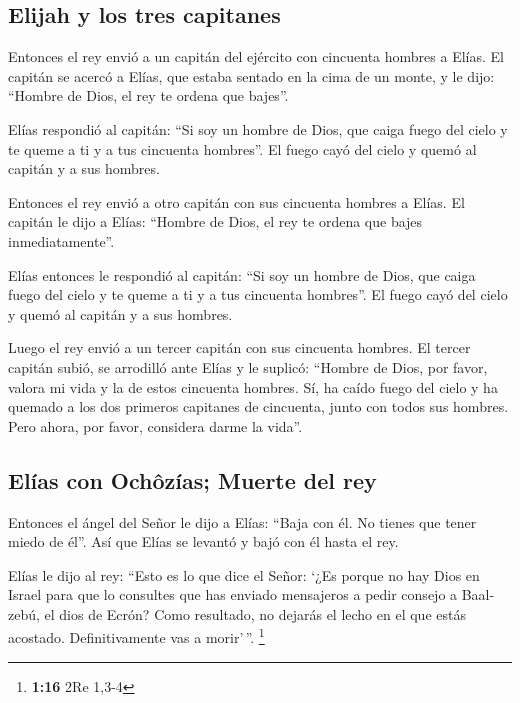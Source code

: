 \hypertarget{elijah-y-los-tres-capitanes}{%
\subsection{Elijah y los tres
capitanes}\label{elijah-y-los-tres-capitanes}}

 Entonces el rey envió a un capitán del ejército con
cincuenta hombres a Elías. El capitán se acercó a Elías, que estaba
sentado en la cima de un monte, y le dijo: ``Hombre de Dios, el rey te
ordena que bajes''.

 Elías respondió al capitán: ``Si soy un hombre de Dios,
que caiga fuego del cielo y te queme a ti y a tus cincuenta hombres''.
El fuego cayó del cielo y quemó al capitán y a sus hombres.

 Entonces el rey envió a otro capitán con sus cincuenta
hombres a Elías. El capitán le dijo a Elías: ``Hombre de Dios, el rey te
ordena que bajes inmediatamente''.

 Elías entonces le respondió al capitán: ``Si soy un
hombre de Dios, que caiga fuego del cielo y te queme a ti y a tus
cincuenta hombres''. El fuego cayó del cielo y quemó al capitán y a sus
hombres.

 Luego el rey envió a un tercer capitán con sus cincuenta
hombres. El tercer capitán subió, se arrodilló ante Elías y le suplicó:
``Hombre de Dios, por favor, valora mi vida y la de estos cincuenta
hombres.  Sí, ha caído fuego del cielo y ha quemado a los
dos primeros capitanes de cincuenta, junto con todos sus hombres. Pero
ahora, por favor, considera darme la vida''.

\hypertarget{eluxedas-con-ochuxf4zuxedas-muerte-del-rey}{%
\subsection{Elías con Ochôzías; Muerte del
rey}\label{eluxedas-con-ochuxf4zuxedas-muerte-del-rey}}

 Entonces el ángel del Señor le dijo a Elías: ``Baja con
él. No tienes que tener miedo de él''. Así que Elías se levantó y bajó
con él hasta el rey.

 Elías le dijo al rey: ``Esto es lo que dice el Señor:
`¿Es porque no hay Dios en Israel para que lo consultes que has enviado
mensajeros a pedir consejo a Baal-zebú, el dios de Ecrón? Como
resultado, no dejarás el lecho en el que estás acostado. Definitivamente
vas a morir'\,''. \footnote{\textbf{1:16} 2Re 1,3-4}

